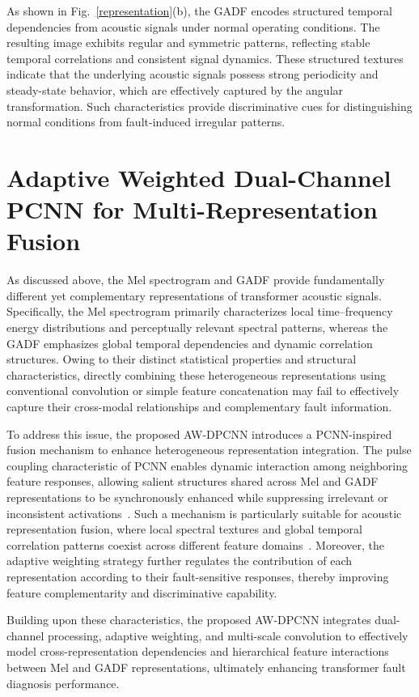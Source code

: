 \documentclass[journal]{IEEEtran}
\begin{document}
As shown in Fig.~\ref{representation}(b), the GADF encodes structured temporal dependencies from acoustic signals under normal operating conditions. The resulting image exhibits regular and symmetric patterns, reflecting stable temporal correlations and consistent signal dynamics. These structured textures indicate that the underlying acoustic signals possess strong periodicity and steady-state behavior, which are effectively captured by the angular transformation. Such characteristics provide discriminative cues for distinguishing normal conditions from fault-induced irregular patterns.

\section{Adaptive Weighted Dual-Channel PCNN for Multi-Representation Fusion}
\label{section3}
As discussed above, the Mel spectrogram and GADF provide fundamentally different yet complementary representations of transformer acoustic signals. Specifically, the Mel spectrogram primarily characterizes local time--frequency energy distributions and perceptually relevant spectral patterns, whereas the GADF emphasizes global temporal dependencies and dynamic correlation structures. Owing to their distinct statistical properties and structural characteristics, directly combining these heterogeneous representations using conventional convolution or simple feature concatenation may fail to effectively capture their cross-modal relationships and complementary fault information.

To address this issue, the proposed AW-DPCNN introduces a PCNN-inspired fusion mechanism to enhance heterogeneous representation integration. The pulse coupling characteristic of PCNN enables dynamic interaction among neighboring feature responses, allowing salient structures shared across Mel and GADF representations to be synchronously enhanced while suppressing irrelevant or inconsistent activations~\cite{Li_2018}. Such a mechanism is particularly suitable for acoustic representation fusion, where local spectral textures and global temporal correlation patterns coexist across different feature domains~\cite{kangEnhancementAlgorithmColor2021}. Moreover, the adaptive weighting strategy further regulates the contribution of each representation according to their fault-sensitive responses, thereby improving feature complementarity and discriminative capability.

Building upon these characteristics, the proposed AW-DPCNN integrates dual-channel processing, adaptive weighting, and multi-scale convolution to effectively model cross-representation dependencies and hierarchical feature interactions between Mel and GADF representations, ultimately enhancing transformer fault diagnosis performance.
\end{document}
